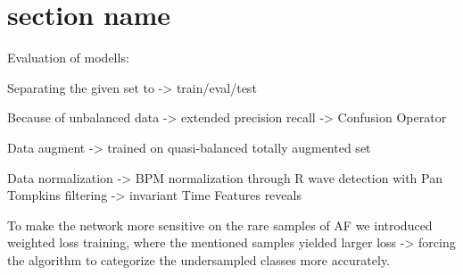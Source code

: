 \section{section name}

Evaluation of modells:

Separating the given set to -> train/eval/test

Because of unbalanced data -> extended precision recall -> Confusion Operator

Data augment -> trained on quasi-balanced totally augmented set

Data normalization -> BPM normalization through R wave detection with Pan Tompkins filtering -> invariant Time Features reveals

To make the network more sensitive on the rare samples of AF we introduced weighted loss training, where the mentioned samples yielded larger loss -> forcing the algorithm to categorize the undersampled classes more accurately.
